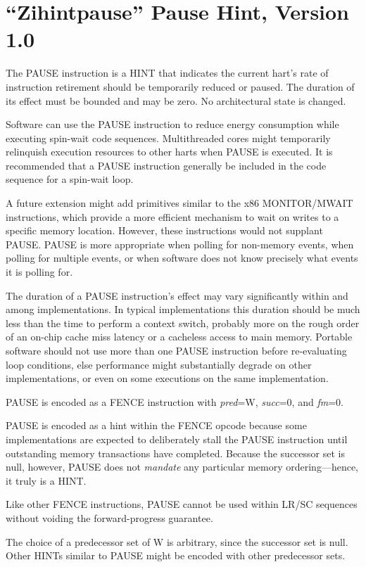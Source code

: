\chapter{``Zihintpause'' Pause Hint, Version 1.0}
\label{chap:zihintpause}

The PAUSE instruction is a HINT that indicates the current hart's rate of
instruction retirement should be temporarily reduced or paused.  The duration of its
effect must be bounded and may be zero.  No architectural state is changed.

\begin{commentary}
Software can use the PAUSE instruction to reduce energy consumption while
executing spin-wait code sequences.  Multithreaded cores might temporarily
relinquish execution resources to other harts when PAUSE is executed.
It is recommended that a PAUSE instruction generally be included in the code
sequence for a spin-wait loop.

A future extension might add primitives similar to the x86 MONITOR/MWAIT
instructions, which provide a more efficient mechanism to wait on writes to
a specific memory location.
However, these instructions would not supplant PAUSE.
PAUSE is more appropriate when polling for non-memory events, when polling for
multiple events, or when software does not know precisely what events it is
polling for.

The duration of a PAUSE instruction's effect may vary significantly within and
among implementations.
In typical implementations this duration should be much less than the time to perform a context switch, probably more on the rough order of an on-chip cache miss latency or a cacheless access to main memory.
Portable software should not use more than one PAUSE instruction before
re-evaluating loop conditions, else performance might substantially degrade on
other implementations, or even on some executions on the same implementation.
\end{commentary}

PAUSE is encoded as a FENCE instruction with {\em pred}=W, {\em succ}=0,
and {\em fm}=0.

\begin{commentary}
PAUSE is encoded as a hint within the FENCE opcode because some
implementations are expected to deliberately stall the PAUSE instruction until outstanding
memory transactions have completed.
Because the successor set is null, however, PAUSE does not {\em mandate} any
particular memory ordering---hence, it truly is a HINT.

Like other FENCE instructions, PAUSE cannot be used within LR/SC sequences
without voiding the forward-progress guarantee.

The choice of a predecessor set of W is arbitrary, since the successor set is
null.
Other HINTs similar to PAUSE might be encoded with other predecessor sets.
\end{commentary}
